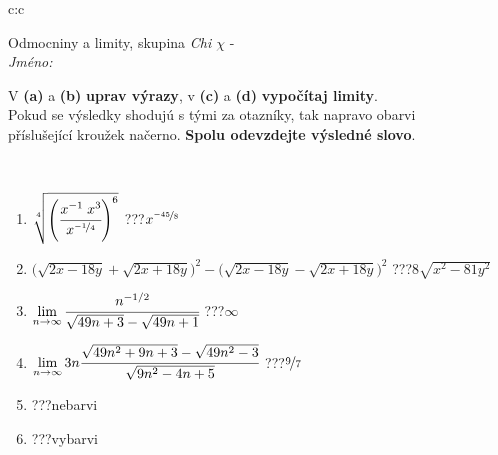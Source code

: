 \documentclass[10pt]{report}
\begin{document}
\newpage
\thispagestyle{empty}
\begin{tabular}{c:c}
\begin{minipage}[c][104.5mm][t]{0.5\linewidth}
\begin{center}
\vspace{7mm}
{\huge Odmocniny a limity, skupina \textit{Chi $\chi$} -}\\[5mm]
\textit{Jméno:}\phantom{xxxxxxxxxxxxxxxxxxxxxxxxxxxxxxxxxxxxxxxxxxxxxxxxxxxxxxxxxxxxxxxxx}\\[5mm]
\begin{minipage}{0.95\linewidth}
\begin{center}
V \textbf{(a)} a \textbf{(b)} \textbf{uprav výrazy}, v \textbf{(c)} a \textbf{(d)} \textbf{vypočítaj limity}.\\Pokud se výsledky shodujú s tými za otazníky, tak napravo obarvi\\příslušející kroužek načerno. \textbf{Spolu odevzdejte výsledné slovo}.
\end{center}
\end{minipage}
\\[1mm]
\begin{minipage}{0.79\linewidth}
\begin{center}
\begin{varwidth}{\linewidth}
\begin{enumerate}
\small
\item $\sqrt[4]{\left(\cfrac{x^{-1}\;x^{3}}{x^{\nicefrac{-1}{4}}}\right)^{6}}$\quad \dotfill\; ???\;\dotfill \quad $x^{\nicefrac{-45}{8}}$
\item {\footnotesize{\scriptsize$\big(\sqrt{2x-18y}+\sqrt{2x+18y}\big)^2-\big(\sqrt{2x-18y}-\sqrt{2x+18y}\big)^2$}\quad \dotfill\; ???\;\dotfill \quad $8\sqrt{x^2-81y^2}$}
\item $\lim\limits_{n\to\infty}\cfrac{n^{-1/2}}{\sqrt{49n+3}-\sqrt{49n+1}}$\quad \dotfill\; ???\;\dotfill \quad $\infty$
\item $\lim\limits_{n\to\infty}3n\cfrac{\sqrt{49n^2+9n+3}-\sqrt{49n^2-3}}{\sqrt{9n^2-4n+5}}$\quad \dotfill\; ???\;\dotfill \quad $\nicefrac{9}{7}$
\item \quad \dotfill\; ???\;\dotfill \quad nebarvi
\item \quad \dotfill\; ???\;\dotfill \quad vybarvi
\end{enumerate}
\end{varwidth}
\end{center}
\end{minipage}
\begin{minipage}{0.20\linewidth}

\end{minipage}
\end{center}
\end{minipage}
\end{tabular}
\end{document}
